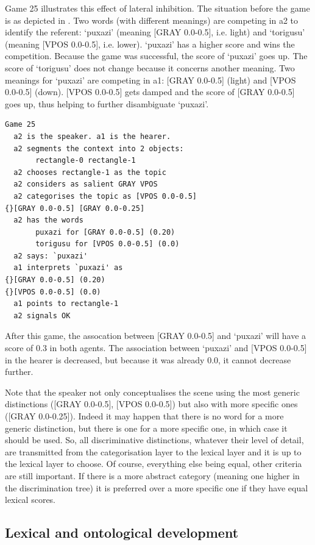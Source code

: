 Game 25 illustrates this effect of 
lateral inhibition. The situation before the game is 
as depicted in . 
Two words (with different meanings) are competing in {\bfshape  a2} to 
identify the referent: `puxazi' (meaning 
{}[GRAY 0.0-0.5], i.e. light) and `torigusu'
(meaning [VPOS 0.0-0.5], i.e. lower).  `puxazi' has
a higher score and wins the competition. Because the game 
was successful, the score
of `puxazi' goes up. The score of `torigusu' 
does not change because it concerns another 
meaning. Two meanings for `puxazi'
are competing in {\bfshape  a1}: [GRAY 0.0-0.5] (light)
and [VPOS 0.0-0.5] (down). [VPOS 0.0-0.5] gets damped and 
the score of [GRAY 0.0-0.5] goes up, thus helping to 
further disambiguate `puxazi'. 
\begin{verbatim}
Game 25
  a2 is the speaker. a1 is the hearer. 
  a2 segments the context into 2 objects: 
       rectangle-0 rectangle-1 
  a2 chooses rectangle-1 as the topic 
  a2 considers as salient GRAY VPOS
  a2 categorises the topic as [VPOS 0.0-0.5] 
{}[GRAY 0.0-0.5] [GRAY 0.0-0.25]
  a2 has the words
       puxazi for [GRAY 0.0-0.5] (0.20)
       torigusu for [VPOS 0.0-0.5] (0.0)
  a2 says: `puxazi'
  a1 interprets `puxazi' as
{}[GRAY 0.0-0.5] (0.20)
{}[VPOS 0.0-0.5] (0.0)
  a1 points to rectangle-1
  a2 signals OK
\end{verbatim}
After this game, the assocation between [GRAY 0.0-0.5] 
and `puxazi' will have a score of 0.3 in both agents. 
The association between `puxazi' and [VPOS 0.0-0.5] 
in the hearer is decreased, but because it was already 
0.0, it cannot decrease further. 

Note that the speaker not only conceptualises the scene using 
the most generic distinctions ([GRAY 0.0-0.5], 
{}[VPOS 0.0-0.5]) but also
with more specific ones ([GRAY 0.0-0.25]). Indeed it 
may happen that there is no word for a more generic 
distinction, but there is one for a more specific 
one, in which case it should be used. 
So, all discriminative distinctions, 
whatever their level of detail, are
transmitted from the categorisation layer to the 
lexical layer and it is up to the lexical layer
to choose. Of course, everything else being equal, 
other criteria are still important. If there is a 
more abstract category (meaning one higher in the 
discrimination tree) it is preferred over a more 
specific one if they have equal lexical scores. 

\subsection{Lexical and ontological development} 

